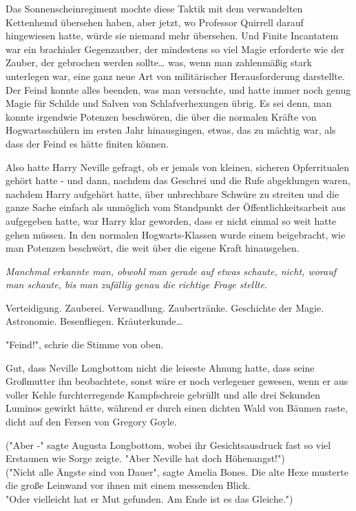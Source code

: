 {Das Sonnenscheinregiment mochte diese Taktik mit dem verwandelten Kettenhemd übersehen haben, aber jetzt, wo Professor Quirrell darauf hingewiesen hatte, würde sie niemand mehr übersehen. Und Finite Incantatem war ein brachialer Gegenzauber, der mindestens so viel Magie erforderte wie der Zauber, der gebrochen werden sollte… was, wenn man zahlenmäßig stark unterlegen war, eine ganz neue Art von militärischer Herausforderung darstellte. Der Feind konnte alles beenden, was man versuchte, und hatte immer noch genug Magie für Schilde und Salven von Schlafverhexungen übrig. Es sei denn, man konnte irgendwie Potenzen beschwören, die über die normalen Kräfte von Hogwartsschülern im ersten Jahr hinausgingen, etwas, das zu mächtig war, als dass der Feind es hätte finiten können.

Also hatte Harry Neville gefragt, ob er jemals von kleinen, sicheren Opferritualen gehört hatte - und dann, nachdem das Geschrei und die Rufe abgeklungen waren, nachdem Harry aufgehört hatte, über unbrechbare Schwüre zu streiten und die ganze Sache einfach als unmöglich vom Standpunkt der Öffentlichkeitsarbeit aus aufgegeben hatte, war Harry klar geworden, dass er nicht einmal so weit hatte gehen müssen. In den normalen Hogwarts-Klassen wurde einem beigebracht, wie man Potenzen beschwört, die weit über die eigene Kraft hinausgehen.

\emph{Manchmal erkannte man, obwohl man gerade auf etwas schaute, nicht, worauf man schaute, bis man zufällig genau die richtige Frage stellte}.

Verteidigung. Zauberei. Verwandlung. Zaubertränke. Geschichte der Magie. Astronomie. Besenfliegen. Kräuterkunde…

"Feind!", schrie die Stimme von oben.

Gut, dass Neville Longbottom nicht die leiseste Ahnung hatte, dass seine Großmutter ihn beobachtete, sonst wäre er noch verlegener gewesen, wenn er aus voller Kehle furchterregende Kampfschreie gebrüllt und alle drei Sekunden Luminos gewirkt hätte, während er durch einen dichten Wald von Bäumen raste, dicht auf den Fersen von Gregory Goyle.

("Aber -" sagte Augusta Longbottom, wobei ihr Gesichtsausdruck fast so viel Erstaunen wie Sorge zeigte. "Aber Neville hat doch Höhenangst!")\\ ("Nicht alle Ängste sind von Dauer", sagte Amelia Bones. Die alte Hexe musterte die große Leinwand vor ihnen mit einem messenden Blick.\\ "Oder vielleicht hat er Mut gefunden. Am Ende ist es das Gleiche.")

}

